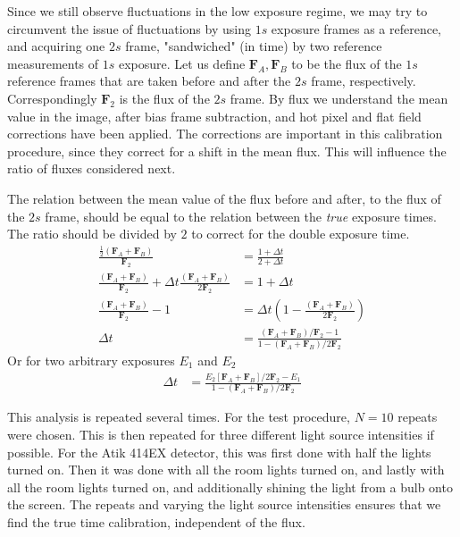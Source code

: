 \documentclass[../main.tex]{subfiles}
\begin{document}
	Since we still observe fluctuations in the low exposure regime, we may try to circumvent the issue of fluctuations by using $1s$ exposure frames as a reference, and acquiring one $2s$ frame, "sandwiched" (in time) by two reference measurements of $1s$ exposure. Let us define $\bm F_A, \bm F_B$ to be the flux of the $1s$ reference frames that are taken before and after the $2s$ frame, respectively. Correspondingly $\bm F_2$ is the flux of the $2s$ frame. By flux we understand the mean value in the image, after bias frame subtraction, and hot pixel and flat field corrections have been applied. The corrections are important in this calibration procedure, since they correct for a shift in the mean flux. This will influence the ratio of fluxes considered next.
	
	The relation between the mean value of the flux before and after, to the flux of the $2s$ frame, should be equal to the relation between the \textit{true} exposure times. The ratio should be divided by $2$ to correct for the double exposure time.
	\begin{align}\label{eq:timecorrectionfactor}
		\frac{\frac12(\bm F_A + \bm F_B) }{
			\bm F_2 } &= \frac{1+\Delta t}{2+\Delta t}\\
		\frac{(\bm F_A + \bm F_B)}{\bm F_2} + \Delta t \frac{(\bm F_A + \bm F_B)}{2 \bm F_2} &= 1+\Delta t\\
		\frac{(\bm F_A + \bm F_B)}{\bm F_2} - 1 &= \Delta t \left(1- \frac{(\bm F_A + \bm F_B)}{2 \bm F_2}\right)\\	
		\Delta t &= 	\frac{(\bm F_A + \bm F_B) / \bm F_2 - 1}{1 - (\bm F_A + \bm F_B)/ 2 \bm F_2} \label{eq:timecalprec}	
	\end{align}
Or for two arbitrary exposures $E_1$ and $E_2$
	\begin{align}
		\Delta t &= 	\frac{E_2[\bm F_A + \bm F_B] / 2\bm F_2 - E_1}{1 - (\bm F_A + \bm F_B)/ 2 \bm F_2} 
	\end{align}
	
This analysis is repeated several times. For the test procedure, $N=10$ repeats were chosen. This is then repeated for three different light source intensities if possible. For the Atik 414EX detector, this was first done with half the lights turned on. Then it was done with all the room lights turned on, and lastly with all the room lights turned on, and additionally shining the light from a bulb onto the screen. The repeats and varying the light source intensities ensures that we find the true time calibration, independent of the flux. 
\end{document}
